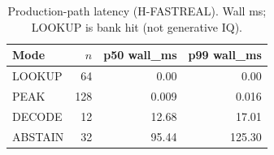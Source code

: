 \begin{table}[t]
\centering
\caption{Production-path latency (H-FASTREAL). Wall ms; LOOKUP is bank hit (not generative IQ).}
\label{tab:latency}
\begin{tabular}{lrrr}
\toprule
Mode & $n$ & p50 wall\_ms & p99 wall\_ms \\
\midrule
LOOKUP & 64 & 0.00 & 0.00 \\
PEAK & 128 & 0.009 & 0.016 \\
DECODE & 12 & 12.68 & 17.01 \\
ABSTAIN & 32 & 95.44 & 125.30 \\
\bottomrule
\end{tabular}
\end{table}
